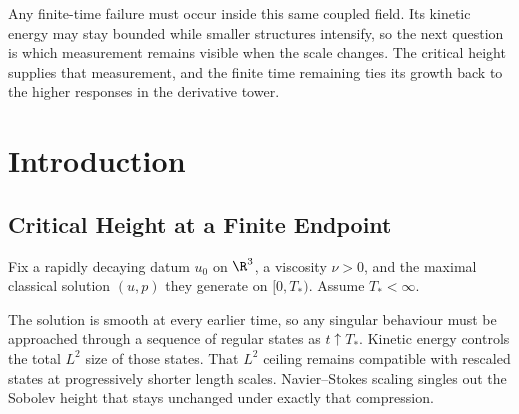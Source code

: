 Any finite-time failure must occur inside this same coupled field.
Its kinetic energy may stay bounded while smaller structures intensify, so the next question is which measurement remains visible when the scale changes.
The critical height supplies that measurement, and the finite time remaining ties its growth back to the higher responses in the derivative tower.


\section{Introduction}\label{sec:Introduction}












\subsection{Critical Height at a Finite Endpoint}\label{sub:CriticalHeightAtAFiniteEndpoint}

Fix a rapidly decaying datum \(u_0\) on \(\R^3\), a viscosity \(\nu>0\), and the maximal classical solution \((u,p)\) they generate on \([0,T_*)\).
Assume \(T_*<\infty\).

The solution is smooth at every earlier time, so any singular behaviour must be approached through a sequence of regular states as \(t\uparrow T_*\).
Kinetic energy controls the total \(L^2\) size of those states.
That \(L^2\) ceiling remains compatible with rescaled states at progressively shorter length scales.
Navier--Stokes scaling singles out the Sobolev height that stays unchanged under exactly that compression.

